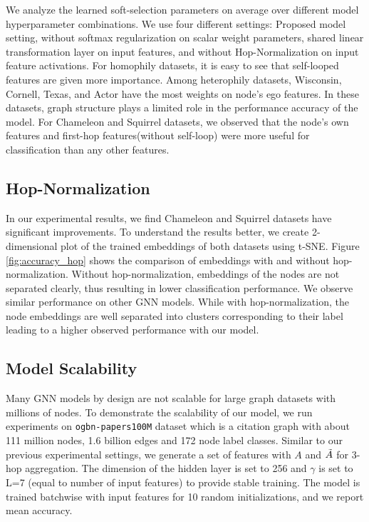 \documentclass[sigconf,natbib=false]{acmart}
\begin{document}
We analyze the learned soft-selection parameters on average over different model hyperparameter combinations. We use four different settings: Proposed model setting, without softmax regularization on scalar weight parameters, shared linear transformation layer on input features, and without Hop-Normalization on input feature activations.  For homophily datasets, it is easy to see that self-looped features are given more importance. Among heterophily datasets, Wisconsin, Cornell, Texas, and Actor have the most weights on node's ego features. In these datasets, graph structure plays a limited role in the performance accuracy of the model. For Chameleon and Squirrel datasets, we observed that the node's own features and first-hop features(without self-loop) were more useful for classification than any other features.



\subsection{Hop-Normalization}

In our experimental results, we find Chameleon and Squirrel datasets have significant improvements. To understand the results better, we create 2-dimensional plot of the trained embeddings of both datasets using t-SNE\cite{maaten_accelerating_2014}. Figure \ref{fig:accuracy_hop} shows the comparison of embeddings with and without hop-normalization. Without hop-normalization, embeddings of the nodes are not separated clearly, thus resulting in lower classification performance. We observe similar performance on other GNN models. While with hop-normalization, the node embeddings are well separated into clusters corresponding to their label leading to a higher observed performance with our model. 


\subsection{Model Scalability}

Many GNN models by design are not scalable for large graph datasets with millions of nodes. 
To demonstrate the scalability of our model, we run experiments on \texttt{ogbn-papers100M} dataset \cite{wang_microsoft_2020}\cite{hu_open_2021} which is a citation graph with about 111 million nodes, 1.6 billion edges and 172 node label classes. Similar to our previous experimental settings, we generate a set of features with $A$ and $\Tilde{A}$ for 3-hop aggregation. The dimension of the hidden layer is set to 256 and $\gamma$ is set to L=7 (equal to number of input features) to provide stable training. The model is trained batchwise with input features for 10 random initializations, and we report mean accuracy.
\end{document}
